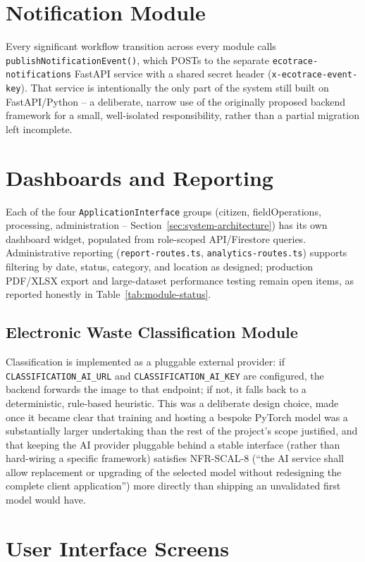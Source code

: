 \section{Notification Module}
Every significant workflow transition across every module calls
\texttt{publishNotificationEvent()}, which POSTs to the separate
\texttt{ecotrace-notifications} FastAPI service with a shared secret header
(\texttt{x-ecotrace-event-key}). That service is intentionally the only part of
the system still built on FastAPI/Python -- a deliberate, narrow use of the
originally proposed backend framework for a small, well-isolated
responsibility, rather than a partial migration left incomplete.

\section{Dashboards and Reporting}
Each of the four \texttt{ApplicationInterface} groups (citizen,
fieldOperations, processing, administration --
Section~\ref{sec:system-architecture}) has its own dashboard widget, populated
from role-scoped API/Firestore queries. Administrative reporting
(\texttt{report-routes.ts}, \texttt{analytics-routes.ts}) supports filtering by
date, status, category, and location as designed; production PDF/XLSX export
and large-dataset performance testing remain open items, as reported
honestly in Table~\ref{tab:module-status}.

\subsection{Electronic Waste Classification Module}
\label{sec:classification-module}
Classification is implemented as a pluggable external provider: if
\texttt{CLASSIFICATION\_AI\_URL} and \texttt{CLASSIFICATION\_AI\_KEY} are
configured, the backend forwards the image to that endpoint; if not, it falls
back to a deterministic, rule-based heuristic. This was a deliberate design
choice, made once it became clear that training and hosting a bespoke
PyTorch model was a substantially larger undertaking than the rest of the
project's scope justified, and that keeping the AI provider pluggable behind a
stable interface (rather than hard-wiring a specific framework) satisfies
NFR-SCAL-8 (``the AI service shall allow replacement or upgrading of the
selected model without redesigning the complete client application'') more
directly than shipping an unvalidated first model would have.

\section{User Interface Screens}

